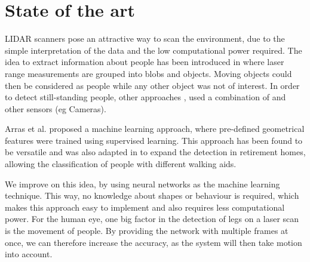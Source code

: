 \section{State of the art}

LIDAR scanners pose an attractive way to scan the environment, due to the simple interpretation of the data and the low computational power required. The idea to extract information about people has been introduced in \cite{1013691} where laser range measurements  are grouped into blobs and objects. Moving objects could then be considered as people while any other object was not of interest. In order to detect still-standing people, other approaches \cite{kleinehagenbrock2002person}, \cite{aguirre2014leg} used a combination of  and other sensors (eg Cameras).

Arras et al. proposed a machine learning approach, where pre-defined geometrical features were trained using supervised learning. This approach has been found to be versatile and was also adapted in \cite{weinrich2014people} to expand the detection in retirement homes, allowing the classification of people with different walking aids.

We improve on this idea, by using neural networks as the machine learning technique. This way, no knowledge about shapes or behaviour is required, which makes this approach easy to implement and also requires less computational power. For the human eye, one big factor in the detection of legs on a laser scan is the movement of people. By providing the network with multiple frames at once, we can therefore increase the accuracy, as the system will then take motion into account.